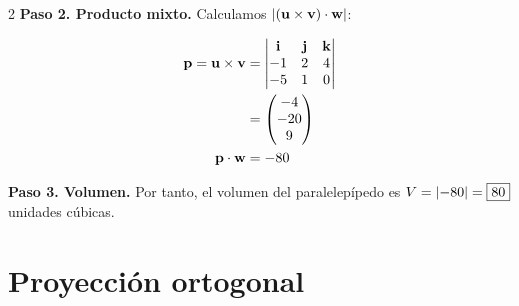 \begin{example}
\begin{myproof}
\begin{multicols}{2}
\textbf{Paso 2. Producto mixto.} Calculamos $\left\vert({\bf u} \times {\bf v}) \cdot {\bf w}\right\vert$:

\begin{align*}
{\bf p} = {\bf u} \times {\bf v} &=
\begin{vmatrix}
\mathbf{i} & \mathbf{j} & \mathbf{k} \\
-1 & 2 & 4 \\
-5 & 1 & 0 \\
\end{vmatrix} \\
&= \begin{pmatrix} -4 \\ -20 \\ 9 \end{pmatrix}\\
{\bf p} \cdot {\bf w} &= -80
\end{align*}

\textbf{Paso 3. Volumen.} Por tanto, el volumen del paralelepípedo es $V=\left\vert-80\right\vert=\boxed{80}$ unidades cúbicas.

\end{multicols}
\end{myproof}
\end{example}


\section{Proyección ortogonal}

